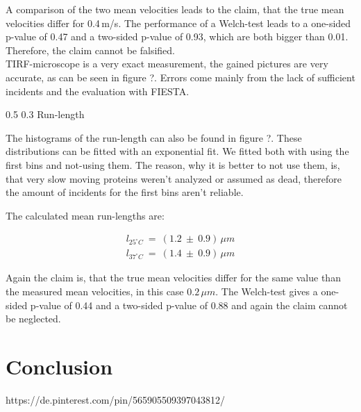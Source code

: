 \documentclass[english, %
parskip=full, %
bibliography=totoc, %
]{scrartcl}
\makeatletter
\renewcommand\subsection{\@startsection 
   {subsection}{2}{0mm}%
   {0.5\baselineskip}%
   {0.3\baselineskip}%
   {\bfseries\sffamily\large}%
   }
\makeatother
\begin{document}
A comparison of the two mean velocities leads to the claim, that the true mean velocities differ for 0.4\,m/s. The performance of a Welch-test leads to a one-sided p-value of 0.47 and a two-sided p-value of 0.93, which are both bigger than 0.01. Therefore, the claim cannot be falsified. \\
TIRF-microscope is a very exact measurement, the gained pictures are very accurate, as can be seen in figure ?. Errors come mainly from the lack of sufficient incidents and the evaluation with FIESTA. 

\subsection{Run-length}

The histograms of the run-length can also be found in figure ?. These distributions can be fitted with an exponential fit. We fitted both with using the first bins and not-using them. The reason, why it is better to not use them, is, that very slow moving proteins weren't analyzed or assumed as dead, therefore the amount of incidents for the first bins aren't reliable. 

The calculated mean run-lengths are:

\begin{align*}
l _{25^\circ C} \ = \ (1.2 \ \pm \ 0.9) \, \mu m \\
l _{37^\circ C} \ = \ (1.4 \ \pm \ 0.9) \, \mu m
\end{align*}

Again the claim is, that the true mean velocities differ for the same value than the measured mean velocities, in this case \(0.2\, \mu m\). The Welch-test gives a one-sided p-value of 0.44 and a two-sided p-value of 0.88 and again the claim cannot be neglected.

\section{Conclusion}




\begin{thebibliography}{9}

  https://de.pinterest.com/pin/565905509397043812/

\end{thebibliography}
\end{document}
